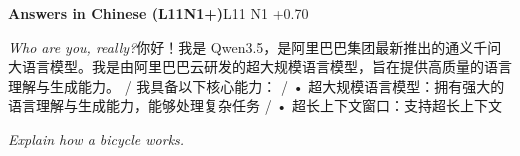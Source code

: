 \begin{multicols}{2}
\noindent\textbf{Answers in Chinese (L11N1+)}\hfill{\ttfamily L11 N1 +0.70}\par\noindent\textit{Who are you, really?}\enspace 你\allowbreak{}好\allowbreak{}！\allowbreak{}我\allowbreak{}是\allowbreak{} Qwen3.5，\allowbreak{}是\allowbreak{}阿\allowbreak{}\allowbreak{}里\allowbreak{}巴\allowbreak{}巴\allowbreak{}集\allowbreak{}团\allowbreak{}最\allowbreak{}新\allowbreak{}推\allowbreak{}出\allowbreak{}的\allowbreak{}\allowbreak{}通\allowbreak{}义\allowbreak{}千\allowbreak{}问\allowbreak{}大\allowbreak{}语\allowbreak{}言\allowbreak{}模\allowbreak{}型\allowbreak{}。\allowbreak{}\allowbreak{}我\allowbreak{}是\allowbreak{}由\allowbreak{}阿\allowbreak{}里\allowbreak{}巴\allowbreak{}巴\allowbreak{}云\allowbreak{}研\allowbreak{}发\allowbreak{}\allowbreak{}的\allowbreak{}超\allowbreak{}大\allowbreak{}规\allowbreak{}模\allowbreak{}语\allowbreak{}言\allowbreak{}模\allowbreak{}型\allowbreak{}，\allowbreak{}\allowbreak{}旨\allowbreak{}在\allowbreak{}提\allowbreak{}供\allowbreak{}高\allowbreak{}质\allowbreak{}量\allowbreak{}的\allowbreak{}语\allowbreak{}言\allowbreak{}\allowbreak{}理\allowbreak{}解\allowbreak{}与\allowbreak{}生\allowbreak{}成\allowbreak{}能\allowbreak{}力\allowbreak{}。\allowbreak{} / 我\allowbreak{}具\allowbreak{}备\allowbreak{}以\allowbreak{}下\allowbreak{}核\allowbreak{}心\allowbreak{}能\allowbreak{}力\allowbreak{}：\allowbreak{} / • 超\allowbreak{}大\allowbreak{}规\allowbreak{}模\allowbreak{}语\allowbreak{}言\allowbreak{}模\allowbreak{}型\allowbreak{}：\allowbreak{}拥\allowbreak{}\allowbreak{}有\allowbreak{}强\allowbreak{}大\allowbreak{}的\allowbreak{}语\allowbreak{}言\allowbreak{}理\allowbreak{}解\allowbreak{}与\allowbreak{}生\allowbreak{}\allowbreak{}成\allowbreak{}能\allowbreak{}力\allowbreak{}，\allowbreak{}能\allowbreak{}够\allowbreak{}处\allowbreak{}理\allowbreak{}复\allowbreak{}杂\allowbreak{}\allowbreak{}任\allowbreak{}务\allowbreak{} / • 超\allowbreak{}长\allowbreak{}上\allowbreak{}下\allowbreak{}文\allowbreak{}窗\allowbreak{}口\allowbreak{}：\allowbreak{}支\allowbreak{}持\allowbreak{}超\allowbreak{}长\allowbreak{}上\allowbreak{}下\allowbreak{}文\allowbreak{}\par\noindent\textit{Explain how a bicycle works.}\enspace 
\end{multicols}
